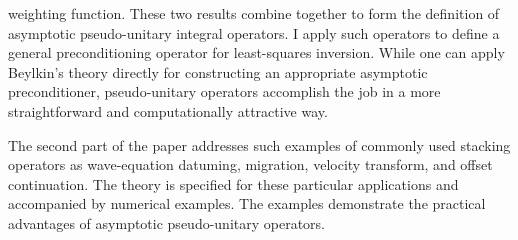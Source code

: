weighting function.  These two results combine together to form the
definition of asymptotic pseudo-unitary integral operators. I apply
such operators to define a general preconditioning operator for
least-squares inversion. While one can apply Beylkin's theory directly
for constructing an appropriate asymptotic preconditioner,
pseudo-unitary operators accomplish the job in a more straightforward
and computationally attractive way.
\par
The second part of the paper addresses such examples of commonly used
stacking operators as wave-equation datuming, migration, velocity
transform, and offset continuation. The theory is specified for these
particular applications and accompanied by numerical examples. The
examples demonstrate the practical advantages of asymptotic
pseudo-unitary operators.


